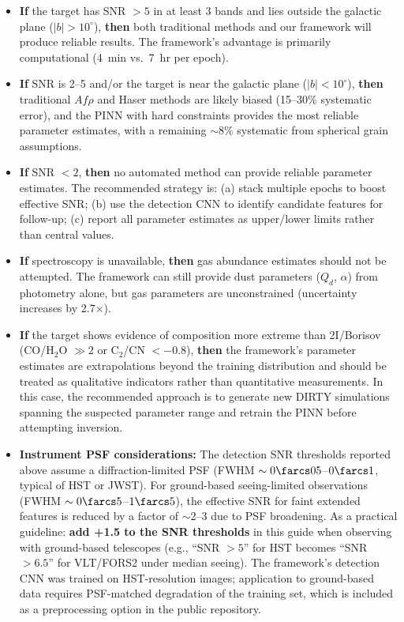 \documentclass[preprint2]{aastex631}
\begin{document}
\begin{itemize}
    \item \textbf{If} the target has SNR $>5$ in at least 3 bands and lies outside the galactic plane ($|b| > 10^\circ$), \textbf{then} both traditional methods and our framework will produce reliable results. The framework's advantage is primarily computational (4~min vs.\ 7~hr per epoch).

    \item \textbf{If} SNR is 2--5 and/or the target is near the galactic plane ($|b| < 10^\circ$), \textbf{then} traditional $Af\rho$ and Haser methods are likely biased (15--30\% systematic error), and the PINN with hard constraints provides the most reliable parameter estimates, with a remaining $\sim$8\% systematic from spherical grain assumptions.

    \item \textbf{If} SNR $<2$, \textbf{then} no automated method can provide reliable parameter estimates. The recommended strategy is: (a) stack multiple epochs to boost effective SNR; (b) use the detection CNN to identify candidate features for follow-up; (c) report all parameter estimates as upper/lower limits rather than central values.

    \item \textbf{If} spectroscopy is unavailable, \textbf{then} gas abundance estimates should not be attempted. The framework can still provide dust parameters ($Q_d$, $\alpha$) from photometry alone, but gas parameters are unconstrained (uncertainty increases by 2.7$\times$).

    \item \textbf{If} the target shows evidence of composition more extreme than 2I/Borisov (CO/H$_2$O $\gg 2$ or C$_2$/CN $<-0.8$), \textbf{then} the framework's parameter estimates are extrapolations beyond the training distribution and should be treated as qualitative indicators rather than quantitative measurements. In this case, the recommended approach is to generate new DIRTY simulations spanning the suspected parameter range and retrain the PINN before attempting inversion.
    \item \textbf{Instrument PSF considerations:} The detection SNR thresholds reported above assume a diffraction-limited PSF (FWHM $\sim 0\farcs05$--$0\farcs1$, typical of HST or JWST). For ground-based seeing-limited observations (FWHM $\sim 0\farcs5$--$1\farcs5$), the effective SNR for faint extended features is reduced by a factor of $\sim$2--3 due to PSF broadening. As a practical guideline: \textbf{add +1.5 to the SNR thresholds} in this guide when observing with ground-based telescopes (e.g., ``SNR $>5$'' for HST becomes ``SNR $>6.5$'' for VLT/FORS2 under median seeing). The framework's detection CNN was trained on HST-resolution images; application to ground-based data requires PSF-matched degradation of the training set, which is included as a preprocessing option in the public repository.
\end{itemize}
\end{document}
